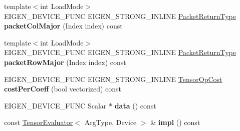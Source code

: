 \begin{DoxyCompactItemize}
{\footnotesize template$<$int Load\+Mode$>$ }\\E\+I\+G\+E\+N\+\_\+\+D\+E\+V\+I\+C\+E\+\_\+\+F\+U\+NC E\+I\+G\+E\+N\+\_\+\+S\+T\+R\+O\+N\+G\+\_\+\+I\+N\+L\+I\+NE \hyperlink{group___sparse_core___module}{Packet\+Return\+Type} {\bfseries packet\+Col\+Major} (Index index) const
\item 
\mbox{\label{struct_eigen_1_1_tensor_evaluator_3_01const_01_tensor_broadcasting_op_3_01_broadcast_00_01_arg_type_01_4_00_01_device_01_4_a5130b87c59b3dee4237f20b9dc8ea8be}} 
{\footnotesize template$<$int Load\+Mode$>$ }\\E\+I\+G\+E\+N\+\_\+\+D\+E\+V\+I\+C\+E\+\_\+\+F\+U\+NC E\+I\+G\+E\+N\+\_\+\+S\+T\+R\+O\+N\+G\+\_\+\+I\+N\+L\+I\+NE \hyperlink{group___sparse_core___module}{Packet\+Return\+Type} {\bfseries packet\+Row\+Major} (Index index) const
\item 
\mbox{\label{struct_eigen_1_1_tensor_evaluator_3_01const_01_tensor_broadcasting_op_3_01_broadcast_00_01_arg_type_01_4_00_01_device_01_4_a459c02c70e44b4fcf69ec188746e7c2b}} 
E\+I\+G\+E\+N\+\_\+\+D\+E\+V\+I\+C\+E\+\_\+\+F\+U\+NC E\+I\+G\+E\+N\+\_\+\+S\+T\+R\+O\+N\+G\+\_\+\+I\+N\+L\+I\+NE \hyperlink{class_eigen_1_1_tensor_op_cost}{Tensor\+Op\+Cost} {\bfseries cost\+Per\+Coeff} (bool vectorized) const
\item 
\mbox{\label{struct_eigen_1_1_tensor_evaluator_3_01const_01_tensor_broadcasting_op_3_01_broadcast_00_01_arg_type_01_4_00_01_device_01_4_aa1866318e35438aff7efba404add1b1a}} 
E\+I\+G\+E\+N\+\_\+\+D\+E\+V\+I\+C\+E\+\_\+\+F\+U\+NC Scalar $\ast$ {\bfseries data} () const
\item 
\mbox{\label{struct_eigen_1_1_tensor_evaluator_3_01const_01_tensor_broadcasting_op_3_01_broadcast_00_01_arg_type_01_4_00_01_device_01_4_acbd0b63fd911b2a64f5b40edf33d07f6}} 
const \hyperlink{struct_eigen_1_1_tensor_evaluator}{Tensor\+Evaluator}$<$ Arg\+Type, Device $>$ \& {\bfseries impl} () const

\end{DoxyCompactItemize}
